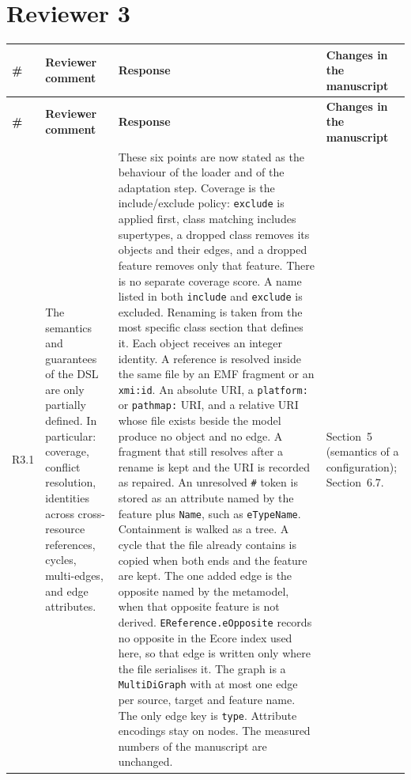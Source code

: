 \documentclass[11pt,a4paper]{article}
\begin{document}
\section*{Reviewer 3}

\begin{longtable}{@{}P{1.0cm}P{4.3cm}P{5.9cm}P{3.9cm}@{}}
\toprule
\textbf{\#} & \textbf{Reviewer comment} & \textbf{Response} & \textbf{Changes in the manuscript} \\
\midrule
\endfirsthead
\toprule
\textbf{\#} & \textbf{Reviewer comment} & \textbf{Response} & \textbf{Changes in the manuscript} \\
\midrule
\endhead
\bottomrule
\endfoot

R3.1 &
The semantics and guarantees of the DSL are only partially defined. In particular: coverage, conflict resolution, identities across cross-resource references, cycles, multi-edges, and edge attributes. &
These six points are now stated as the behaviour of the loader and of the adaptation step. Coverage is the include/exclude policy: \texttt{exclude} is applied first, class matching includes supertypes, a dropped class removes its objects and their edges, and a dropped feature removes only that feature. There is no separate coverage score. A name listed in both \texttt{include} and \texttt{exclude} is excluded. Renaming is taken from the most specific class section that defines it. Each object receives an integer identity. A reference is resolved inside the same file by an EMF fragment or an \texttt{xmi:id}. An absolute URI, a \texttt{platform:} or \texttt{pathmap:} URI, and a relative URI whose file exists beside the model produce no object and no edge. A fragment that still resolves after a rename is kept and the URI is recorded as repaired. An unresolved \texttt{\#} token is stored as an attribute named by the feature plus \texttt{Name}, such as \texttt{eTypeName}. Containment is walked as a tree. A cycle that the file already contains is copied when both ends and the feature are kept. The one added edge is the opposite named by the metamodel, when that opposite feature is not derived. \texttt{EReference.eOpposite} records no opposite in the Ecore index used here, so that edge is written only where the file serialises it. The graph is a \texttt{MultiDiGraph} with at most one edge per source, target and feature name. The only edge key is \texttt{type}. Attribute encodings stay on nodes. The measured numbers of the manuscript are unchanged. &
Section~5 (semantics of a configuration); Section~6.7. \\
\midrule


\end{longtable}
\end{document}
